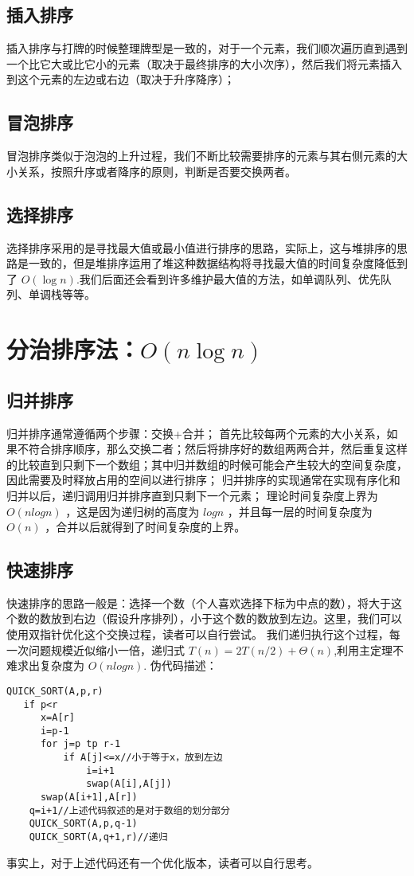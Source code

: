 \documentclass[12pt,a4paper,UTF16]{ctexbook}
\theoremstyle{plain}
\begin{document}
\subsection{插入排序}
插入排序与打牌的时候整理牌型是一致的，对于一个元素，我们顺次遍历直到遇到一个比它大或比它小的元素（取决于最终排序的大小次序），然后我们将元素插入到这个元素的左边或右边（取决于升序降序）；
\subsection{冒泡排序}
冒泡排序类似于泡泡的上升过程，我们不断比较需要排序的元素与其右侧元素的大小关系，按照升序或者降序的原则，判断是否要交换两者。
\subsection{选择排序}
选择排序采用的是寻找最大值或最小值进行排序的思路，实际上，这与堆排序的思路是一致的，但是堆排序运用了堆这种数据结构将寻找最大值的时间复杂度降低到了
$O(\log n)$.我们后面还会看到许多维护最大值的方法，如单调队列、优先队列、单调栈等等。
\section{分治排序法：$O(n\log n)$}
\subsection{归并排序}
归并排序通常遵循两个步骤：交换+合并；
首先比较每两个元素的大小关系，如果不符合排序顺序，那么交换二者；然后将排序好的数组两两合并，然后重复这样的比较直到只剩下一个数组；其中归并数组的时候可能会产生较大的空间复杂度，因此需要及时释放占用的空间以进行排序；
归并排序的实现通常在实现有序化和归并以后，递归调用归并排序直到只剩下一个元素；
理论时间复杂度上界为 $
O
(
n
log
⁡
n
)$
 ，这是因为递归树的高度为 $
log
⁡
n$
 ，并且每一层的时间复杂度为 $
O
(
n
)$
 ，合并以后就得到了时间复杂度的上界。
\subsection{快速排序}
快速排序的思路一般是：选择一个数（个人喜欢选择下标为中点的数），将大于这个数的数放到右边（假设升序排列），小于这个数的数放到左边。这里，我们可以使用双指针优化这个交换过程，读者可以自行尝试。
我们递归执行这个过程，每一次问题规模近似缩小一倍，递归式 $
T(n)=2T(n/2)+Θ(n)$,利用主定理不难求出复杂度为 $O(nlogn)$.
伪代码描述：
\begin{lstlisting}[basicstyle=\ttfamily]
  QUICK_SORT(A,p,r)
   if p<r
      x=A[r]
      i=p-1
      for j=p tp r-1
          if A[j]<=x//小于等于x，放到左边
              i=i+1
              swap(A[i],A[j])
      swap(A[i+1],A[r])
    q=i+1//上述代码叙述的是对于数组的划分部分
    QUICK_SORT(A,p,q-1)
    QUICK_SORT(A,q+1,r)//递归
\end{lstlisting}
事实上，对于上述代码还有一个优化版本，读者可以自行思考。
\end{document}
